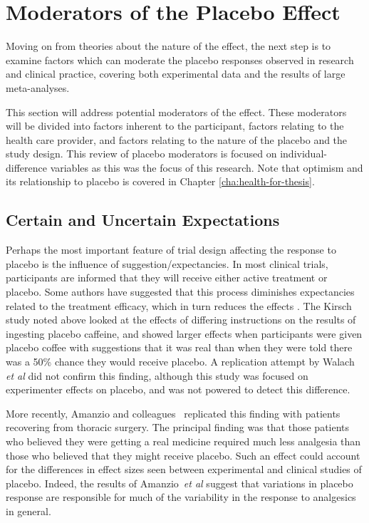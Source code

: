 \section{Moderators of the Placebo Effect}
\label{sec:moder-plac-effect}

Moving on from theories about the nature of the effect, the next step is to examine factors which can moderate the placebo responses observed in research and clinical practice, covering both experimental data and the results of large meta-analyses. 


This section will address potential moderators of the effect.
These moderators will be divided into factors inherent to the participant, factors relating to the health care provider, and factors relating to the nature of the placebo and the study design. This review of placebo moderators is focused on individual-difference variables as this was the focus of this research. Note that optimism and its relationship to placebo is covered in Chapter \ref{cha:health-for-thesis}.


\subsection{Certain and Uncertain Expectations}
\label{sec:cert-uncert-expect}

Perhaps the most important feature of trial design affecting the response to placebo  is the influence of suggestion/expectancies. In most clinical trials, participants are informed that they will receive either active treatment or placebo. Some authors have suggested \cite{kirsch1988double}  that this process diminishes expectancies related to the treatment efficacy, which in turn reduces the effects \cite{Kleijnen1994}. The Kirsch study noted above looked at the effects of differing instructions on the results of ingesting placebo caffeine, and showed larger effects when participants were given placebo coffee with suggestions that it was real than when they were told there was a 50\% chance they would receive placebo. A replication attempt by Walach \textit{et al} did not confirm this finding, although this study was focused on experimenter effects on placebo, and was not powered to detect this difference. 

More recently, Amanzio and colleagues~\cite{Amanzio2001} replicated this finding with patients recovering from thoracic surgery. The principal finding was that those patients who believed they were getting a real medicine required much less analgesia than those who believed that they might receive placebo. Such an effect could account for the differences in effect sizes seen between experimental and clinical studies of placebo. Indeed, the results of  Amanzio~\textit{et al} suggest that variations in placebo response are responsible for much of the variability in the response to analgesics in general.

